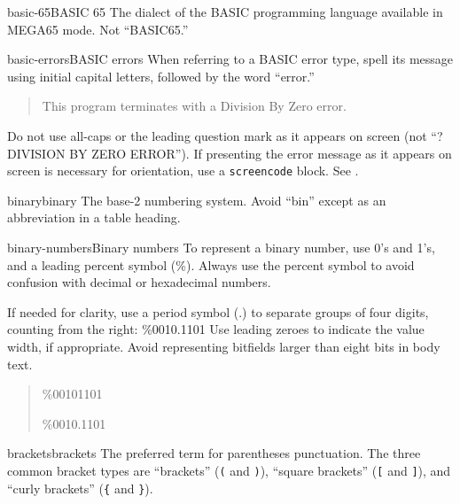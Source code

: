 \begin{sgentry}{basic-65}{BASIC 65}
    The dialect of the BASIC programming language available in MEGA65 mode. Not ``BASIC65.''
\end{sgentry}

\begin{sgentry}{basic-errors}{BASIC errors}
    When referring to a BASIC error type, spell its message using initial capital letters, followed by the word ``error.''

    \begin{quote}
        This program terminates with a Division By Zero error.
    \end{quote}

    Do not use all-caps or the leading question mark as it appears on screen (not ``?DIVISION BY ZERO ERROR''). If presenting the error message as it appears on screen is necessary for orientation, use a \texttt{screencode} block. See .
\end{sgentry}

\begin{sgentry}{binary}{binary}
    The base-2 numbering system. Avoid ``bin'' except as an abbreviation in a table heading.
\end{sgentry}

\begin{sgentry}{binary-numbers}{Binary numbers}
    To represent a binary number, use 0's and 1's, and a leading percent symbol (\%). Always use the percent symbol to avoid confusion with decimal or hexadecimal numbers.

    If needed for clarity, use a period symbol (.) to separate groups of four digits, counting from the right: \%0010.1101 Use leading zeroes to indicate the value width, if appropriate. Avoid representing bitfields larger than eight bits in body text.

    \begin{quote}
        \%00101101

        \%0010.1101
    \end{quote}
\end{sgentry}

\begin{sgentry}{brackets}{brackets}
    The preferred term for parentheses punctuation. The three common bracket types are ``brackets'' (\texttt{(} and \texttt{)}), ``square brackets'' (\texttt{[} and \texttt{]}), and ``curly brackets'' (\texttt{\{} and \texttt{\}}).
\end{sgentry}

